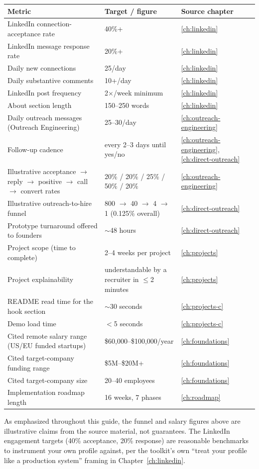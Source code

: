 \begin{longtable}{p{} p{} p{}}
\toprule
\textbf{Metric} & \textbf{Target / figure} & \textbf{Source chapter} \\
\midrule
\endhead
LinkedIn connection-acceptance rate & 40\%+ & \ref{ch:linkedin} \\
LinkedIn message response rate & 20\%+ & \ref{ch:linkedin} \\
Daily new connections & 25/day & \ref{ch:linkedin} \\
Daily substantive comments & 10+/day & \ref{ch:linkedin} \\
LinkedIn post frequency & 2$\times$/week minimum & \ref{ch:linkedin} \\
About section length & 150--250 words & \ref{ch:linkedin} \\
Daily outreach messages (Outreach Engineering) & 25--30/day & \ref{ch:outreach-engineering} \\
Follow-up cadence & every 2--3 days until yes/no & \ref{ch:outreach-engineering}, \ref{ch:direct-outreach} \\
Illustrative acceptance $\rightarrow$ reply $\rightarrow$ positive $\rightarrow$ call $\rightarrow$ convert
rates & 20\% / 20\% / 25\% / 50\% / 20\% & \ref{ch:outreach-engineering} \\
Illustrative outreach-to-hire funnel & 800 $\rightarrow$ 40 $\rightarrow$ 4 $\rightarrow$ 1 (0.125\% overall) &
\ref{ch:direct-outreach} \\
Prototype turnaround offered to founders & $\sim$48 hours & \ref{ch:direct-outreach} \\
Project scope (time to complete) & 2--4 weeks per project & \ref{ch:projects} \\
Project explainability & understandable by a recruiter in $\le$2 minutes & \ref{ch:projects} \\
README read time for the hook section & $\sim$30 seconds & \ref{ch:projects-c} \\
Demo load time & $<$5 seconds & \ref{ch:projects-c} \\
Cited remote salary range (US/EU funded startups) & \$60,000--\$100,000/year & \ref{ch:foundations} \\
Cited target-company funding range & \$5M--\$20M+ & \ref{ch:foundations} \\
Cited target-company size & 20--40 employees & \ref{ch:foundations} \\
Implementation roadmap length & 16 weeks, 7 phases & \ref{ch:roadmap} \\
\bottomrule
\end{longtable}

\begin{caution}
As emphasized throughout this guide, the funnel and salary figures above are illustrative claims from the source
material, not guarantees. The LinkedIn engagement targets (40\% acceptance, 20\% response) are reasonable
benchmarks to instrument your own profile against, per the toolkit's own ``treat your profile like a production
system'' framing in Chapter~\ref{ch:linkedin}.
\end{caution}

